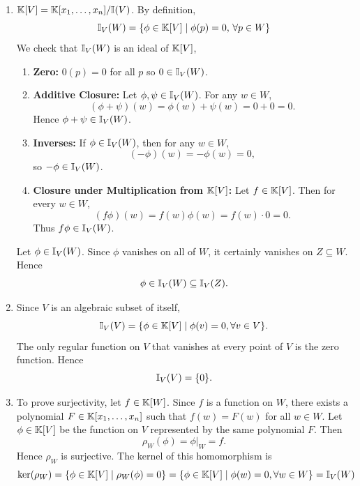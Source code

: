 \documentclass[Notebook.tex]{subfiles}
\begin{document}
\begin{solution}
    \bbni
    \begin{enumerate}
        \item $\mathbb K[V] = \mathbb K[x_1, \ldots, x_n] /\mathbb I(V)$. By definition, 
        \[\mathbb I_V(W) = \{\phi \in \mathbb K[V] \mid \phi(p) = 0, \, \forall p \in W\}\]
        We check that $\mathbb I_V(W)$ is an ideal of $\mathbb K[V]$,
        \begin{enumerate}
            \item \textbf{Zero:} $0(p) = 0$ for all $p$ so $0 \in \mathbb I_V(W)$. 
            \item \textbf{Additive Closure:}  Let $\phi,\psi\in \mathbb I_V(W)$. For any $w\in W$,
            \[
            (\phi+\psi)(w)=\phi(w)+\psi(w)=0+0=0.
            \]
            Hence $\phi+\psi\in \mathbb I_V(W)$.
            \item \textbf{Inverses:} If $\phi\in \mathbb I_V(W)$, then for any $w\in W$,
            \[
            (-\phi)(w)=-\phi(w)=0,
            \]
            so $-\phi\in \mathbb I_V(W)$.
            \item \textbf{Closure under Multiplication from $\mathbb K[V]$:} Let $f\in \mathbb K[V]$. Then for every $w\in W$,
            \[
            (f\phi)(w)=f(w)\phi(w)=f(w)\cdot 0=0.
            \]
            Thus $f\phi\in \mathbb I_V(W)$.
        \end{enumerate}

        Let $\phi\in \mathbb I_V(W)$. Since $\phi$ vanishes on all of $W$, it certainly vanishes on $Z \subseteq W$. Hence
        \[
        \phi \in \mathbb I_V(W)\subseteq \mathbb I_V(Z).
        \]

        \item Since $V$ is an algebraic subset of itself,
        \[
        \mathbb I_V(V)=\{\phi\in \mathbb K[V] \mid \phi(v)=0, \forall v\in V\}.
        \]
        The only regular function on $V$ that vanishes at every point of $V$ is the zero function. Hence
        \[
        \mathbb I_V(V)=\{0\}.
        \]

        \item To prove surjectivity, let $f\in \mathbb K[W]$. Since $f$ is a  function on $W$, there exists a polynomial $F\in \mathbb K[x_1,\dots,x_n]$ such that $f(w)=F(w)$ {for all } $w\in W$. 
        Let $\phi\in \mathbb K[V]$ be the function on $V$ represented by the same polynomial $F$. Then
        \[
        \rho_W(\phi)=\phi|_W=f.
        \]
        Hence $\rho_W$ is surjective.
        The kernel of this homomorphism is 
        \[
        \ker(\rho_W)
        =
        \{\phi\in \mathbb K[V]\mid \rho_W(\phi)=0\} = \{\phi \in \mathbb K[V] \mid \phi(w) = 0, \forall w \in W\} = \mathbb I_V(W) 
        \]


\end{enumerate}
\end{solution}
\end{document}
